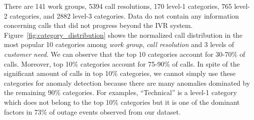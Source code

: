 There are 141 work groups, 5394 call resolutions, 170 level-1
categories, 765 level-2 categories, and 2882 level-3 categories. 
Data do not contain any information concerning calls that did
not progress beyond the IVR system. 
Figure~\ref{fig:category_distribution} shows the normalized call distribution in the most popular 10 categories 
among {\em work group}, {\em call resolution} and 3 levels of {\em customer need}. We can observe that the 
top 10 categories account for 30-70\% of calls. Moreover, top 10\% categories account for 75-90\% of calls. 
In spite of the significant amount of calls in top 10\% categories, we cannot simply use these categories for 
anomaly detection because there are many anomalies dominated by the remaining 90\% categories. 
For examples, ``Technical'' is a level-1 category which does not belong to the top 10\% categories but
it is one of the dominant factors in 73\% of outage events observed from our dataset. 


